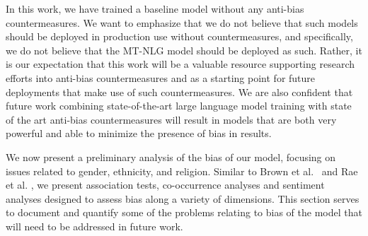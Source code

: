 \documentclass[11pt]{article}
\begin{document}
In this work, we have trained a baseline model without any anti-bias countermeasures.
We want to emphasize that we do not believe that such models should be deployed in production use without countermeasures, and specifically, we do not believe that the MT-NLG model should be deployed as such. 
Rather, it is our expectation that this work will be a valuable resource supporting research efforts into anti-bias countermeasures and as a starting point for future deployments that make use of such countermeasures. We are also confident that future work combining state-of-the-art large language model training with state of the art anti-bias countermeasures will result in models that are both very powerful and able to minimize the presence of bias in results. 

We now present a preliminary analysis of the bias of our model, focusing on issues related to gender, ethnicity, and religion. 
Similar to Brown et al.\ \cite{brown2020language} and Rae et al. \cite{Rae2021Gopher}, we present association tests, co-occurrence analyses and sentiment analyses designed to assess bias along a variety of dimensions. 
This section serves to document and quantify some of the problems relating to bias of the model that will need to be addressed in future work. 


\end{document}
